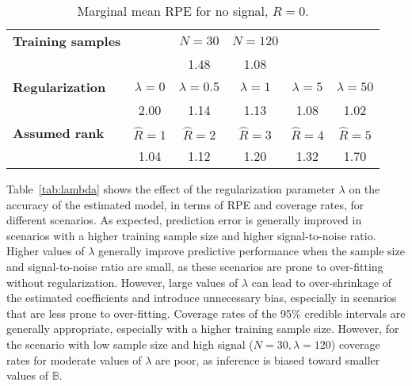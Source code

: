 \documentclass[12pt]{article}
\def\BB{\mathbb{B}}
\begin{document}
\begin{table}
\caption{\label{tab:NoSig} Marginal mean RPE for no signal, $R=0$.}
\centering
\begin{tabular}{l|c c c c c c c c c c}
\hline 
\textbf{Training samples} & & \multicolumn{3}{c}{$N=30$} & \multicolumn{3}{c}{$N=120$} &  & & \\
& & \multicolumn{3}{c}{1.48} &   \multicolumn{3}{c}{1.08} &  & &\\ \hline
\textbf{Regularization} & \multicolumn{2}{c}{$\lambda=0$} & \multicolumn{2}{c}{$\lambda=0.5$} &  \multicolumn{2}{c}{$\lambda=1$} & \multicolumn{2}{c}{$\lambda=5$} & \multicolumn{2}{c}{$\lambda=50$}\\
& \multicolumn{2}{c}{2.00} & \multicolumn{2}{c}{1.14} &  \multicolumn{2}{c}{1.13} & \multicolumn{2}{c}{1.08} & \multicolumn{2}{c}{1.02} \\ \hline 
\textbf{Assumed rank} & \multicolumn{2}{c}{$\hat{R}=1$} & \multicolumn{2}{c}{$\hat{R}=2$} &  \multicolumn{2}{c}{$\hat{R}=3$} & \multicolumn{2}{c}{$\hat{R}=4$} & \multicolumn{2}{c}{$\hat{R}=5$}\\
& \multicolumn{2}{c}{1.04} & \multicolumn{2}{c}{1.12} &  \multicolumn{2}{c}{1.20} & \multicolumn{2}{c}{1.32} & \multicolumn{2}{c}{1.70} \\ \hline 
\end{tabular}
\end{table}

Table~\ref{tab:lambda} shows the effect of the regularization parameter $\lambda$ on the accuracy of the estimated model, in terms of RPE and coverage rates, for different scenarios. As expected, prediction error is generally improved in scenarios with a higher training sample size and higher signal-to-noise ratio. Higher values of $\lambda$ generally improve predictive performance when the sample size and signal-to-noise ratio are small, as these scenarios are prone to over-fitting without regularization. However, large values of $\lambda$ can lead to over-shrinkage of the estimated coefficients and introduce unnecessary bias, especially in scenarios that are less prone to over-fitting. Coverage rates of the 95\% credible intervals are generally appropriate, especially with a higher training sample size.  However, for the scenario with low sample size and high signal ($N=30, \lambda=120$) coverage rates for moderate values of $\lambda$ are poor, as inference is biased toward smaller values of $\BB$.    
\end{document}

